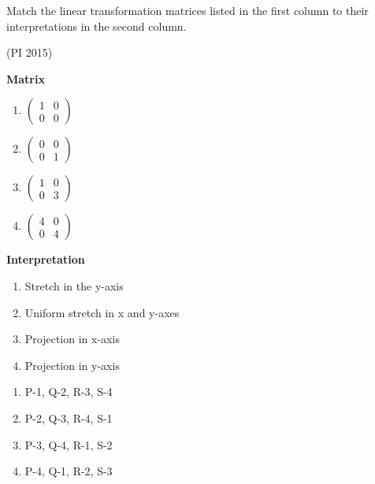 \item Match the linear transformation matrices listed in the first column to their interpretations in the second column.

	\hfill (PI 2015)
	\begin{multicols}{2}
\textbf{Matrix} 
		\begin{enumerate}[label=\Alph*., start=16]
\item  $\begin{pmatrix} 1 & 0 \\ 0 & 0 \end{pmatrix}$ 
\item  $\begin{pmatrix} 0 & 0 \\ 0 & 1 \end{pmatrix}$ 
\item  $\begin{pmatrix} 1 & 0 \\ 0 & 3 \end{pmatrix}$ 
\item  $\begin{pmatrix} 4 & 0 \\ 0 & 4 \end{pmatrix}$ 
\end{enumerate}
\columnbreak
 \textbf{Interpretation} 
\begin{enumerate}[label=\arabic*.]
\item  Stretch in the y-axis 
\item  Uniform stretch in x and y-axes 
\item  Projection in x-axis                
\item  Projection in y-axis                
\end{enumerate}
\end{multicols}
	\begin{multicols}{2}
\begin{enumerate}
\item P-1, Q-2, R-3, S-4
\item P-2, Q-3, R-4, S-1    
\item P-3, Q-4, R-1, S-2
\item P-4, Q-1, R-2, S-3
\end{enumerate}
\end{multicols}

